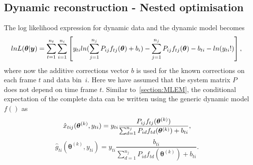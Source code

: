 \subsection{Dynamic reconstruction - Nested optimisation}
The log likelihood expression for dynamic data and the dynamic model becomes
\begin{equation}
    lnL(\bm{\theta}|\bm{y})  = \sum_{t=1}^{n_t}\sum_{i=1}^{n_i}\left[ y_{ti} ln(\sum_{j=1}^{n_j} P_{ij} f_{tj}(\bm\theta) + b_i) -\sum_{j=1}^{n_j} P_{ij} f_{tj}(\bm\theta) - b_{ti} - ln({y_{ti}}!) \right] \\, \\
\label{eqn:dynamic_log_likelihood}
\end{equation}
%
where now the additive corrections vector $b$ is used for the known corrections on each frame $t$ and data \mbox{bin $i$}. Here we have assumed that the system matrix $P$ does not depend on time frame $t$.
Similar to~\ref{section:MLEM}, the conditional expectation of the complete data can be written using the generic dynamic model $f()$ as 
\begin{equation}
\label{eq:Dynamic_complete_Data_Expectation}
\hat{x}_{tij}(\bm{\theta}^{(k)},y_{ti}) = y_{ti}
\frac{P_{ij} f_{tj}(\bm\theta^{(k)})}
{\sum_{d=1}^{n_j} P_{id} f_{td}(\bm\theta^{(k)}) + b_{ti}}\\,
\end{equation}
%
\begin{equation}
\label{eq:Dynamic_complete_Data_Expectation2}
\hat{g}_{ti}(\bm{\theta}^{(k)},y_{ti}) = y_{ti}
\frac{b_{ti}}{\sum_{d=1}^{n_j} P_{id} f_{td}(\bm\theta^{(k)}) + b_{ti}} .
\end{equation}
%

